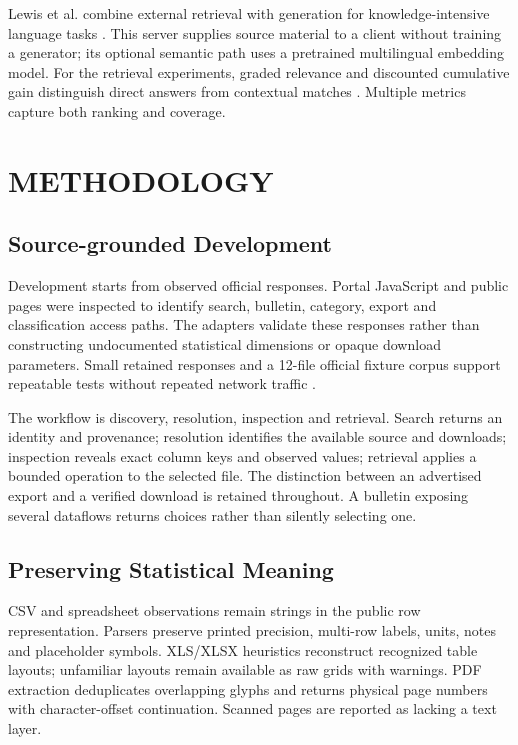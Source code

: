 \documentclass[a4paper,12pt]{report}
\begin{document}
Lewis et al. combine external retrieval with generation for knowledge-intensive language tasks \cite{rag}. This server supplies source material to a client without training a generator; its optional semantic path uses a pretrained multilingual embedding model. For the retrieval experiments, graded relevance and discounted cumulative gain distinguish direct answers from contextual matches \cite{ndcg}. Multiple metrics capture both ranking and coverage.

\chapter{METHODOLOGY}
\section{Source-grounded Development}
Development starts from observed official responses. Portal JavaScript and public pages were inspected to identify search, bulletin, category, export and classification access paths. The adapters validate these responses rather than constructing undocumented statistical dimensions or opaque download parameters. Small retained responses and a 12-file official fixture corpus support repeatable tests without repeated network traffic \cite{source-investigation,project}.

The workflow is discovery, resolution, inspection and retrieval. Search returns an identity and provenance; resolution identifies the available source and downloads; inspection reveals exact column keys and observed values; retrieval applies a bounded operation to the selected file. The distinction between an advertised export and a verified download is retained throughout. A bulletin exposing several dataflows returns choices rather than silently selecting one.

\section{Preserving Statistical Meaning}
CSV and spreadsheet observations remain strings in the public row representation. Parsers preserve printed precision, multi-row labels, units, notes and placeholder symbols. XLS/XLSX heuristics reconstruct recognized table layouts; unfamiliar layouts remain available as raw grids with warnings. PDF extraction deduplicates overlapping glyphs and returns physical page numbers with character-offset continuation. Scanned pages are reported as lacking a text layer.
\end{document}
